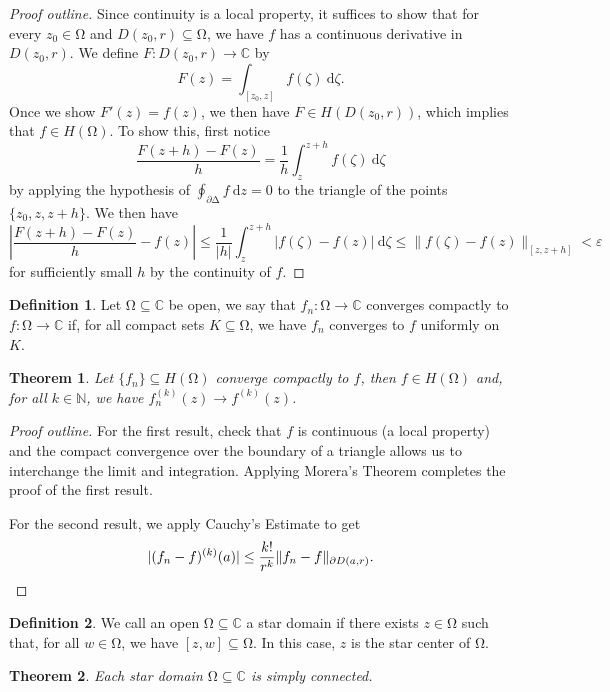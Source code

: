 \documentclass[letterpaper,12pt]{article}
\theoremstyle{definition}
\newtheorem{definition}{Definition}[section]
\theoremstyle{plain}
\newtheorem{thm}{Theorem}[section]
\theoremstyle{remark}
\newcommand{\N}{\mathbb{N}}
\newcommand{\C}{\mathbb{C}}
\let\oldOmega\Omega
\renewcommand{\Omega}{\mathrm{\oldOmega}}
\let\oldDelta\Delta
\renewcommand{\Delta}{\mathrm{\oldDelta}}
\begin{document}
\begin{proof}[Proof outline]
Since continuity is a local property, it suffices to show that for every $z_0\in\Omega$ and $D(z_0,r)\subseteq \Omega$, we have $f$ has a continuous derivative in $D(z_0,r)$. We define $F:D(z_0,r)\to\C$ by
\[F(z) = \int_{[z_0,z]}f(\zeta)\ \mathrm{d}\zeta.\]
Once we show $F'(z)=f(z)$, we then have $F\in H(D(z_0,r))$, which implies that $f\in H(\Omega)$. To show this, first notice
\[\frac{F(z+h)-F(z)}{h} = \frac{1}{h}\int_z^{z+h}f(\zeta)\ \mathrm{d}\zeta\]
by applying the hypothesis of $\oint_{\partial \Delta}f\ \mathrm{d}z = 0$ to the triangle of the points $\{z_0,z,z+h\}$. We then have
\[\left|\frac{F(z+h)-F(z)}{h}-f(z)\right|\leq \frac{1}{|h|}\int_z^{z+h} |f(\zeta)-f(z)|\ \mathrm{d}\zeta \leq \|f(\zeta)-f(z)\|_{[z,z+h]} < \varepsilon\]
for sufficiently small $h$ by the continuity of $f$.
\end{proof}

\begin{definition}
Let $\Omega\subseteq \C$ be open, we say that $f_n:\Omega\to\C$ converges compactly to $f:\Omega\to\C$ if, for all compact sets $K\subseteq \Omega$, we have $f_n$ converges to $f$ uniformly on $K$.
\end{definition}

\begin{thm}
Let $\{f_n\}\subseteq H(\Omega)$ converge compactly to $f$, then $f\in H(\Omega)$ and, for all $k\in\N$, we have $f_n^{(k)}(z)\to f^{(k)}(z)$.
\end{thm}

\begin{proof}[Proof outline]
For the first result, check that $f$ is continuous (a local property) and the compact convergence over the boundary of a triangle allows us to interchange the limit and integration. Applying Morera's Theorem completes the proof of the first result.

For the second result, we apply Cauchy's Estimate to get
\[|(f_n-f)^{(k)}(a)|\leq \frac{k!}{r^k}\|f_n-f\|_{\partial D(a,r)}.\qedhere\]
\end{proof}

\begin{definition}
We call an open $\Omega\subseteq \C$ a star domain if there exists $z\in\Omega$ such that, for all $w\in \Omega$, we have $[z,w]\subseteq \Omega$. In this case, $z$ is the star center of $\Omega$.
\end{definition}

\begin{thm}
Each star domain $\Omega\subseteq \C$ is simply connected.
\end{thm}
\end{document}
